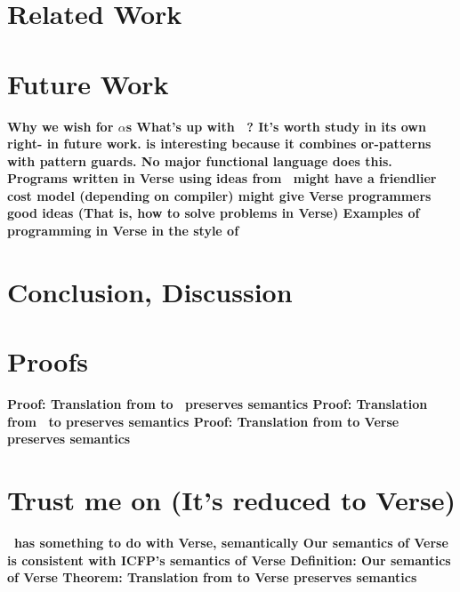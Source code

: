\documentclass[manuscript,screen,review, 12pt]{acmart}
\begin{document}
\section{Related Work}
\section{Future Work}
\begin{outline}[enumerate]
     \bf{Why we wish for $\alpha$s}
     \bf{What's up with \PPlus\ ? It's worth study in its own right- in future work.}
     \bf{\PPlus is interesting because it combines or-patterns with pattern }
        guards. No major functional language does this. 
     \bf{Programs written in Verse using ideas from \VMinus\ might have a }
    friendlier cost model (depending on compiler)
     \bf{\VMinus might give Verse programmers good ideas }
        (That is, how to solve problems in Verse)
     \bf{Examples of programming in Verse in the style of \VMinus }
\end{outline}

\section{Conclusion, Discussion}

\renewcommand\thesection{\Alph{section}}
\setcounter{section}{0}
\section{Proofs}
\begin{outline}
     \bf{Proof: Translation from \VMinus to \D\ preserves semantics }
     \bf{Proof: Translation from \PPlus\ to \VMinus preserves semantics }
     \bf{Proof: Translation from \VMinus to Verse preserves semantics     }
\end{outline}

\section{Trust me on \VMinus (It's reduced to Verse)}
\begin{outline}
     \bf{\VMinus\ has something to do with Verse, semantically }
     \bf{Our semantics of Verse is consistent with ICFP's semantics of Verse }
     \bf{Definition: Our semantics of Verse}
     \bf{Theorem: Translation from \VMinus to Verse preserves semantics     }
\end{outline}
\end{document}

